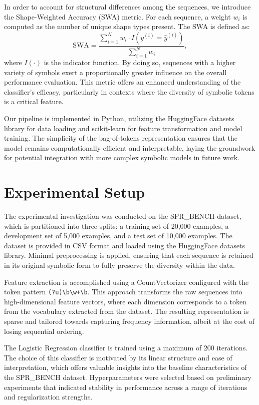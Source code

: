 \documentclass{article}
\begin{document}
In order to account for structural differences among the sequences, we introduce the Shape-Weighted Accuracy (SWA) metric. For each sequence, a weight \( w_i \) is computed as the number of unique shape types present. The SWA is defined as:
\[
\text{SWA} = \frac{\sum_{i=1}^{N} w_i \cdot I\left(y^{(i)} = \hat{y}^{(i)}\right)}{\sum_{i=1}^{N} w_i},
\]
where \( I(\cdot) \) is the indicator function. By doing so, sequences with a higher variety of symbols exert a proportionally greater influence on the overall performance evaluation. This metric offers an enhanced understanding of the classifier's efficacy, particularly in contexts where the diversity of symbolic tokens is a critical feature.

Our pipeline is implemented in Python, utilizing the HuggingFace datasets library for data loading and scikit-learn for feature transformation and model training. The simplicity of the bag-of-tokens representation ensures that the model remains computationally efficient and interpretable, laying the groundwork for potential integration with more complex symbolic models in future work.

\section{Experimental Setup}
The experimental investigation was conducted on the SPR\_BENCH dataset, which is partitioned into three splits: a training set of 20,000 examples, a development set of 5,000 examples, and a test set of 10,000 examples. The dataset is provided in CSV format and loaded using the HuggingFace datasets library. Minimal preprocessing is applied, ensuring that each sequence is retained in its original symbolic form to fully preserve the diversity within the data.

Feature extraction is accomplished using a CountVectorizer configured with the token pattern \texttt{(?u)\textbackslash b\textbackslash w+\textbackslash b}. This approach transforms the raw sequences into high-dimensional feature vectors, where each dimension corresponds to a token from the vocabulary extracted from the dataset. The resulting representation is sparse and tailored towards capturing frequency information, albeit at the cost of losing sequential ordering.

The Logistic Regression classifier is trained using a maximum of 200 iterations. The choice of this classifier is motivated by its linear structure and ease of interpretation, which offers valuable insights into the baseline characteristics of the SPR\_BENCH dataset. Hyperparameters were selected based on preliminary experiments that indicated stability in performance across a range of iterations and regularization strengths.
\end{document}
